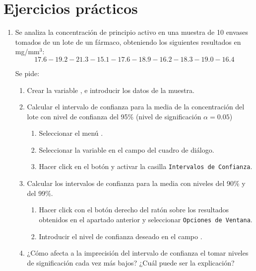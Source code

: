 \documentclass[a4paper]{article}
\begin{document}
\section*{Ejercicios prácticos}
\begin{enumerate}[leftmargin=*]
\item  Se analiza la concentración de principio activo en una
muestra de 10 envases tomados de un lote de un fármaco,
obteniendo los siguientes resultados en mg/mm$^{3}$:
\[
17.6 - 19.2 - 21.3 - 15.1 - 17.6 - 18.9 - 16.2 - 18.3 - 19.0 - 16.4
\]

Se pide:

\begin{enumerate}
\item  Crear la variable , e introducir los
datos de la muestra.

\item  Calcular el intervalo de confianza para la media de la
concentración del lote con nivel de confianza del 95\% (nivel
de significación $\alpha =0.05$)
\begin{indicacion}{
\begin{enumerate}
\item Seleccionar el menú .
\item Seleccionar la variable  en el campo  del cuadro de diálogo.
\item Hacer click en el botón  y activar la casilla \texttt{Intervalos de Confianza}.
\end{enumerate}}
\end{indicacion} 

\item Calcular los intervalos de confianza para la media con niveles del 90\% y
del 99\%.
\begin{indicacion}{
\begin{enumerate}
\item Hacer click con el botón derecho del ratón sobre los resultados obtenidos en el apartado anterior y seleccionar \texttt{Opciones de Ventana}.
\item Introducir el nivel de confianza deseado en el campo .
\end{enumerate}}
\end{indicacion} 

\item  ¿Cómo afecta a la imprecisión del intervalo de confianza el tomar niveles de significación cada vez más bajos? ¿Cuál puede ser la explicación?


\end{enumerate}
\end{enumerate}
\end{document}
